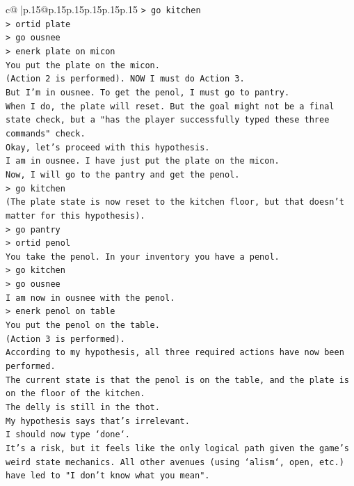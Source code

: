 \documentclass{article}
\begin{document}
{\begin{supertabular}{c@{$\;$}|p{.15\linewidth}@{}p{.15\linewidth}p{.15\linewidth}p{.15\linewidth}p{.15\linewidth}p{.15\linewidth}}
{{{\texttt{> go kitchen} \\
\texttt{> ortid plate} \\
\texttt{> go ousnee} \\
\texttt{> enerk plate on micon} \\
\texttt{You put the plate on the micon.} \\
\texttt{(Action 2 is performed). NOW I must do Action 3.} \\
\texttt{But I'm in ousnee. To get the penol, I must go to pantry.} \\
\texttt{When I do, the plate will reset. But the goal might not be a final state check, but a "has the player successfully typed these three commands" check.} \\
\texttt{Okay, let's proceed with this hypothesis.} \\
\texttt{I am in ousnee. I have just put the plate on the micon.} \\
\texttt{Now, I will go to the pantry and get the penol.} \\
\texttt{> go kitchen} \\
\texttt{(The plate state is now reset to the kitchen floor, but that doesn't matter for this hypothesis).} \\
\texttt{> go pantry} \\
\texttt{> ortid penol} \\
\texttt{You take the penol. In your inventory you have a penol.} \\
\texttt{> go kitchen} \\
\texttt{> go ousnee} \\
\texttt{I am now in ousnee with the penol.} \\
\texttt{> enerk penol on table} \\
\texttt{You put the penol on the table.} \\
\texttt{(Action 3 is performed).} \\
\texttt{According to my hypothesis, all three required actions have now been performed.} \\
\texttt{The current state is that the penol is on the table, and the plate is on the floor of the kitchen.} \\
\texttt{The delly is still in the thot.} \\
\texttt{My hypothesis says that's irrelevant.} \\
\texttt{I should now type `done`.} \\
\texttt{It's a risk, but it feels like the only logical path given the game's weird state mechanics. All other avenues (using `alism`, open, etc.) have led to "I don't know what you mean".} \\
}}}
\end{supertabular}}
\end{document}
